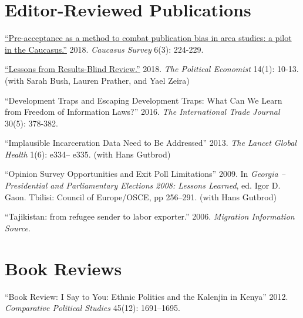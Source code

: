 \documentclass[margin,line]{res}
\begin{document}
{\begin{resume}
\section{\sc  Editor-Reviewed Publications}

\renewcommand{\labelenumi}{O\theenumi.}

\begin{etaremune}
\item \href{https://doi.org/10.1080/23761199.2018.1522796}{``Pre-acceptance as a method to combat publication bias in area studies: a pilot in the Caucasus.''} 2018.  \emph{Caucasus Survey} 6(3): 224-229.
    
\item \href{https://docs.google.com/viewer?a=v&pid=sites&srcid=dW1pY2guZWR1fHBvbGl0aWNhbC1lY29ub21pc3QtbmV3c2xldHRlcnxneDoxZjU3NWI4ZjgyMjNmN2M4}{``Lessons from Results-Blind Review.''} 2018.  \emph{The
    Political Economist} 14(1): 10-13. (with Sarah Bush, Lauren Prather, and Yael Zeira)

 \item ``Development Traps and Escaping Development Traps: What Can We
  Learn from Freedom of Information Laws?'' 2016. \emph{The
    International Trade Journal } 30(5): 378-382.

 \item  ``Implausible Incarceration Data Need to Be Addressed''
  2013. \emph{The Lancet Global Health} 1(6): e334-- e335. (with Hans
  Gutbrod)

 \item  ``Opinion Survey Opportunities and Exit Poll Limitations'' 2009. In
  \emph{Georgia -- Presidential and Parliamentary Elections 2008:
    Lessons Learned}, ed. Igor D. Gaon. Tbilisi: Council of
  Europe/OSCE, pp 256--291. (with Hans Gutbrod)

\item  ``Tajikistan: from refugee sender to labor exporter.''
  2006. \emph{Migration Information Source}.
\end{etaremune}

 
\section{\sc Book Reviews}
\renewcommand{\labelenumi}{R\theenumi.}

\begin{etaremune}
``Book Review: I Say to You: Ethnic Politics and the Kalenjin in
Kenya'' 2012. \emph{Comparative Political Studies} 45(12): 1691--1695.
\end{etaremune}


\end{resume}}
\end{document}
